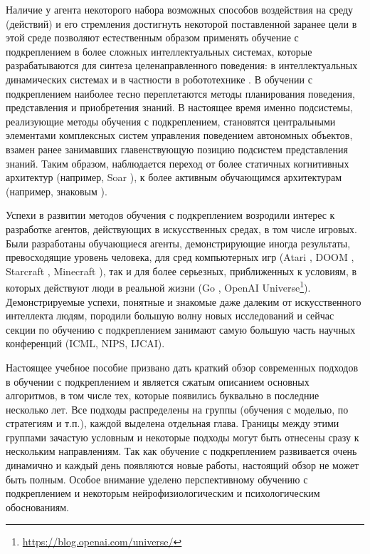 \documentclass[12pt]{memoir}
\begin{document}
	Наличие у агента некоторого набора возможных способов воздействия на среду (действий) и его стремления достигнуть некоторой поставленной заранее цели в этой среде позволяют естественным образом применять обучение с подкреплением в более сложных интеллектуальных системах, которые разрабатываются для синтеза целенаправленного поведения: в интеллектуальных динамических системах и в частности в робототехнике \cite{Osipov2011}. В обучении с подкреплением наиболее тесно переплетаются методы планирования поведения, представления и приобретения знаний. В настоящее время именно подсистемы, реализующие методы обучения с подкреплением, становятся центральными элементами комплексных систем управления поведением автономных объектов, взамен ранее занимавших главенствующую позицию подсистем представления знаний. Таким образом, наблюдается переход от более статичных когнитивных архитектур (например, Soar \cite{Laird2012}), к более активным обучающимся архитектурам (например, знаковым \cite{Osipov2018a}).
	 
	Успехи в развитии методов обучения с подкреплением возродили интерес к разработке агентов, действующих в искусственных средах, в том числе игровых. Были разработаны обучающиеся агенты, демонстрирующие иногда результаты, превосходящие уровень человека, для сред компьютерных игр (Atari \cite{Mnih2013}, DOOM \cite{For2017}, Starcraft \cite{Vinyals2017}, Minecraft \cite{Oh2016}), так и для более серьезных, приближенных к условиям, в которых действуют люди в реальной жизни (Go \cite{Silver2016}, OpenAI Universe\footnote{\url{https://blog.openai.com/universe/}}). Демонстрируемые успехи, понятные и знакомые даже далеким от искусственного интеллекта людям, породили большую волну новых исследований и сейчас секции по обучению с подкреплением занимают самую большую часть научных конференций (ICML, NIPS, IJCAI).
	
	Настоящее учебное пособие призвано дать краткий обзор современных подходов в обучении с подкреплением и является сжатым описанием основных алгоритмов, в том числе тех, которые появились буквально в последние несколько лет. Все подходы распределены на группы (обучения с моделью, по стратегиям и т.п.), каждой выделена отдельная глава. Границы между этими группами зачастую условным и некоторые подходы могут быть отнесены сразу к нескольким направлениям. Так как обучение с подкреплением развивается очень динамично и каждый день появляются новые работы, настоящий обзор не может быть полным. Особое внимание уделено перспективному обучению с подкреплением и некоторым нейрофизиологическим и психологическим обоснованиям.
	
\end{document}
